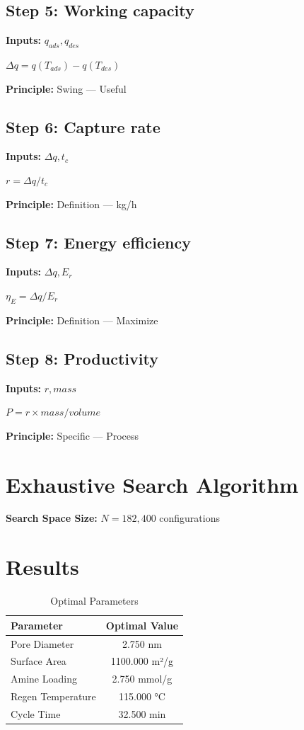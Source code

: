\documentclass[11pt,twocolumn]{article}
\begin{document}
\subsection*{Step 5: Working capacity}
\textbf{Inputs:} $q_{ads}, q_{des}$

$\Delta q = q(T_{ads}) - q(T_{des})$

\textbf{Principle:} Swing --- Useful

\subsection*{Step 6: Capture rate}
\textbf{Inputs:} $\Delta q, t_c$

$r = \Delta q / t_c$

\textbf{Principle:} Definition --- kg/h

\subsection*{Step 7: Energy efficiency}
\textbf{Inputs:} $\Delta q, E_r$

$\eta_E = \Delta q / E_r$

\textbf{Principle:} Definition --- Maximize

\subsection*{Step 8: Productivity}
\textbf{Inputs:} $r, mass$

$P = r \times mass / volume$

\textbf{Principle:} Specific --- Process


\section{Exhaustive Search Algorithm}

\textbf{Search Space Size:} $N = 182,400$ configurations

\section{Results}

\begin{table}[h]
\centering
\caption{Optimal Parameters}
\begin{tabular}{@{}lc@{}}
\toprule
Parameter & Optimal Value \\
\midrule
Pore Diameter & 2.750 nm \\
Surface Area & 1100.000 m²/g \\
Amine Loading & 2.750 mmol/g \\
Regen Temperature & 115.000 °C \\
Cycle Time & 32.500 min \\
\bottomrule
\end{tabular}
\end{table}
\end{document}
